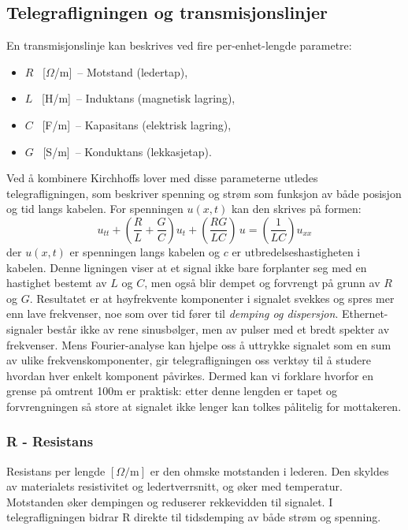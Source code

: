 \subsection{Telegrafligningen og transmisjonslinjer}
En transmisjonslinje kan beskrives ved fire per-enhet-lengde parametre:
\begin{itemize}
    \item $R$ \, [$\Omega$/m] \,-- Motstand (ledertap),
    \item $L$ \, [H/m] \,-- Induktans (magnetisk lagring),
    \item $C$ \, [F/m] \,-- Kapasitans (elektrisk lagring),
    \item $G$ \, [S/m] \,-- Konduktans (lekkasjetap).
\end{itemize}
Ved å kombinere Kirchhoffs lover med disse parameterne utledes telegrafligningen, som beskriver spenning og strøm som funksjon av både posisjon og tid langs kabelen. For spenningen $u(x,t)$ kan den skrives på formen:
\begin{equation}
    u_{tt} + \left(\frac{R}{L} + \frac{G}{C}\right)u_t + \left(\frac{RG}{LC}\right)\,u = \left(\frac{1}{LC}\right) u_{xx}
\end{equation}
der $u(x,t)$ er spenningen langs kabelen og $c$ er utbredelseshastigheten i kabelen.  
Denne ligningen viser at et signal ikke bare forplanter seg med en hastighet bestemt av $L$ og $C$, men også blir dempet og forvrengt på grunn av $R$ og $G$. Resultatet er at høyfrekvente komponenter i signalet svekkes og spres mer enn lave frekvenser, noe som over tid fører til \emph{demping og dispersjon}.  
Ethernet-signaler består ikke av rene sinusbølger, men av pulser med et bredt spekter av frekvenser. Mens Fourier-analyse kan hjelpe oss  å uttrykke signalet som en sum av ulike frekvenskomponenter, gir telegrafligningen oss verktøy til å studere hvordan hver enkelt komponent påvirkes. Dermed kan vi forklare hvorfor en grense på omtrent 100m er praktisk: etter denne lengden er tapet og forvrengningen så store at signalet ikke lenger kan tolkes pålitelig for mottakeren.


\subsubsection{R - Resistans}
Resistans per lengde $[\Omega/\mathrm{m}]$ er den ohmske motstanden i lederen. Den skyldes av materialets resistivitet og ledertverrsnitt, og øker med temperatur. Motstanden øker dempingen og reduserer rekkevidden til signalet. I telegrafligningen bidrar R direkte til tidsdemping av både strøm og spenning.

